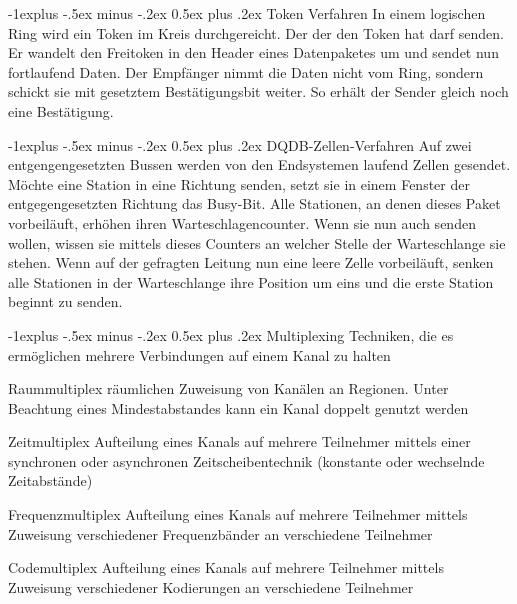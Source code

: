 \documentclass[10pt,landscape]{article}
\makeatletter
\renewcommand{\subsection}{\@startsection{subsection}{2}{0mm}%
                                {-1explus -.5ex minus -.2ex}%
                                {0.5ex plus .2ex}%
                                {\normalfont\normalsize\bfseries}}
\makeatother
\begin{document}
\begin{multicols}{3}
    \subsection{Token Verfahren}
    In einem logischen Ring wird ein Token im Kreis durchgereicht. Der der den Token hat darf senden. Er wandelt den Freitoken in den Header eines Datenpaketes um und sendet nun fortlaufend Daten. Der Empfänger nimmt die Daten nicht vom Ring, sondern schickt sie mit gesetztem Bestätigungsbit weiter. So erhält der Sender gleich noch eine Bestätigung.
    
    \subsection{DQDB-Zellen-Verfahren}
    Auf zwei entgengengesetzten Bussen werden von den Endsystemen laufend Zellen gesendet. Möchte eine Station in eine Richtung senden, setzt sie in einem Fenster der entgegengesetzten Richtung das Busy-Bit. Alle Stationen, an denen dieses Paket vorbeiläuft, erhöhen ihren Warteschlagencounter. Wenn sie nun auch senden wollen, wissen sie mittels dieses Counters an welcher Stelle der Warteschlange sie stehen. Wenn auf der gefragten Leitung nun eine leere Zelle vorbeiläuft, senken alle Stationen in der Warteschlange ihre Position um eins und die erste Station beginnt zu senden.
    
    \subsection{Multiplexing}
    Techniken, die es ermöglichen mehrere Verbindungen auf einem Kanal zu halten
    \begin{description*}
        \item[Raummultiplex] räumlichen Zuweisung von Kanälen an Regionen. Unter Beachtung eines Mindestabstandes kann ein Kanal doppelt genutzt werden
        \item[Zeitmultiplex] Aufteilung eines Kanals auf mehrere Teilnehmer mittels einer synchronen oder asynchronen Zeitscheibentechnik (konstante oder wechselnde Zeitabstände)
        \item[Frequenzmultiplex] Aufteilung eines Kanals auf mehrere Teilnehmer mittels Zuweisung verschiedener Frequenzbänder an verschiedene Teilnehmer
        \item[Codemultiplex] Aufteilung eines Kanals auf mehrere Teilnehmer mittels Zuweisung verschiedener Kodierungen an verschiedene Teilnehmer
    \end{description*}
    

\end{multicols}
\end{document}
